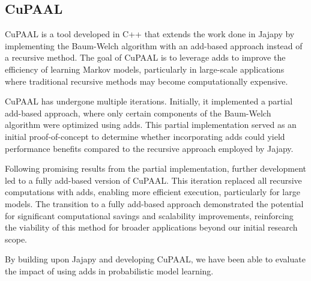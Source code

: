 \subsection{CuPAAL}\label{subsec:cupaal}
CuPAAL is a tool developed in C++ that extends the work done in Jajapy by implementing the Baum-Welch algorithm with an \gls{add}-based approach instead of a recursive method.
The goal of CuPAAL is to leverage \glspl{add} to improve the efficiency of learning Markov models, particularly in large-scale applications where traditional recursive methods may become computationally expensive.

CuPAAL has undergone multiple iterations. Initially, it implemented a partial \gls{add}-based approach, where only certain components of the Baum-Welch algorithm were optimized using \glspl{add}.
This partial implementation served as an initial proof-of-concept to determine whether incorporating \glspl{add} could yield performance benefits compared to the recursive approach employed by Jajapy.

Following promising results from the partial implementation, further development led to a fully \gls{add}-based version of CuPAAL.
This iteration replaced all recursive computations with \glspl{add}, enabling more efficient execution, particularly for large models.
The transition to a fully \gls{add}-based approach demonstrated the potential for significant computational savings and scalability improvements, reinforcing the viability of this method for broader applications beyond our initial research scope.

By building upon Jajapy and developing CuPAAL, we have been able to evaluate the impact of using \glspl{add} in probabilistic model learning.


